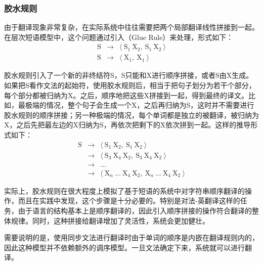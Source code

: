 
\subsubsection{胶水规则}

\parinterval 由于翻译现象非常复杂，在实际系统中往往需要把两个局部翻译线性拼接到一起。在层次短语模型中，这个问题通过引入{\small{}}（Glue Rule）来处理，形式如下：
\begin{eqnarray}
\textrm{S} & \to & \langle\ \textrm{S}_1\ \textrm{X}_2,\ \textrm{S}_1\ \textrm{X}_2\ \rangle \nonumber \\
\textrm{S} & \to & \langle\ \textrm{X}_1,\ \textrm{X}_1\ \rangle \nonumber
\end{eqnarray}

\parinterval 胶水规则引入了一个新的非终结符S，S只能和X进行顺序拼接，或者S由X生成。如果把S看作文法的起始符，使用胶水规则后，相当于把句子划分为若干个部分，每个部分都被归纳为X。之后，顺序地把这些X拼接到一起，得到最终的译文。比如，最极端的情况，整个句子会生成一个X，之后再归纳为S，这时并不需要进行胶水规则的顺序拼接；另一种极端的情况，每个单词都是独立的被翻译，被归纳为X，之后先把最左边的X归纳为S，再依次把剩下的X依次拼到一起。这样的推导形式如下：
\begin{eqnarray}
\textrm{S} & \to & \langle\ \textrm{S}_1\ \textrm{X}_2,\ \textrm{S}_1\ \textrm{X}_2\ \rangle \nonumber \\
                & \to & \langle\ \textrm{S}_3\ \textrm{X}_4\ \textrm{X}_2,\ \textrm{S}_3\ \textrm{X}_4\ \textrm{X}_2\ \rangle \nonumber \\
                & \to & ... \nonumber \\
                & \to & \langle\ \textrm{X}_n\ ...\ \textrm{X}_4\ \textrm{X}_2,\ \textrm{X}_n\ ...\ \textrm{X}_4\ \textrm{X}_2\ \rangle \nonumber
\end{eqnarray}

\parinterval 实际上，胶水规则在很大程度上模拟了基于短语的系统中对字符串顺序翻译的操作，而且在实践中发现，这个步骤是十分必要的。特别是对法-英翻译这样的任务，由于语言的结构基本上是顺序翻译的，因此引入顺序拼接的操作符合翻译的整体规律。同时，这种拼接给翻译增加了灵活性，系统会更加健壮。

\parinterval 需要说明的是，使用同步文法进行翻译时由于单词的顺序是内嵌在翻译规则内的，因此这种模型并不依赖额外的调序模型。一旦文法确定下来，系统就可以进行翻译。

